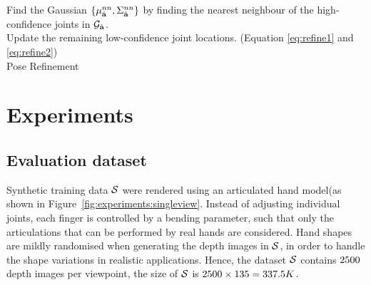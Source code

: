 \begin{algorithm}
	Find the Gaussian $\{\mu_{\hat{\mathbf{a}}}^{nn},\Sigma_{\hat{\mathbf{a}}}^{nn}\}$ by finding the nearest neighbour of the high-confidence joints in $\mathcal{G}_{\hat{\mathbf{a}}}$.\\ 
	Update the remaining low-confidence joint locations. (Equation \ref{eq:refine1} and \ref{eq:refine2}) \\
	\caption{Pose Refinement} 
	\label{alg:testing}
\end{algorithm}


\section{Experiments}



\subsection{Evaluation dataset} 

\label{sec:methodology:eval}
Synthetic training data $\mathcal{S}$ were rendered using an articulated hand model(as shown in Figure~\ref{fig:experiments:singleview}.
Instead of adjusting individual joints, each finger is controlled by a bending parameter, such that only the articulations that can be performed by real hands are considered. 
Hand shapes are mildly randomised when generating the depth images in $\mathcal{S}$, in order to handle the shape variations in realistic applications. 
Hence, the dataset $\mathcal{S}$ contains $2500$ depth images per viewpoint, the size of $\mathcal{S}$ is $2500 \times 135 = 337.5K$. 

